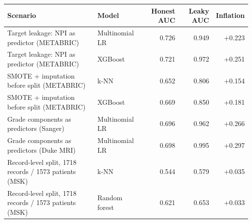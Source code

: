 \begin{tabular}{p{6.2cm}lrrr}
\toprule
Scenario & Model & Honest AUC & Leaky AUC & Inflation \\
\midrule
Target leakage: NPI as predictor (METABRIC) & Multinomial LR & 0.726 & 0.949 & +0.223 \\
Target leakage: NPI as predictor (METABRIC) & XGBoost & 0.721 & 0.972 & +0.251 \\
SMOTE + imputation before split (METABRIC) & k-NN & 0.652 & 0.806 & +0.154 \\
SMOTE + imputation before split (METABRIC) & XGBoost & 0.669 & 0.850 & +0.181 \\
Grade components as predictors (Sanger) & Multinomial LR & 0.696 & 0.962 & +0.266 \\
Grade components as predictors (Duke MRI) & Multinomial LR & 0.698 & 0.995 & +0.297 \\
Record-level split, 1718 records / 1573 patients (MSK) & k-NN & 0.544 & 0.579 & +0.035 \\
Record-level split, 1718 records / 1573 patients (MSK) & Random forest & 0.621 & 0.653 & +0.033 \\
\bottomrule
\end{tabular}